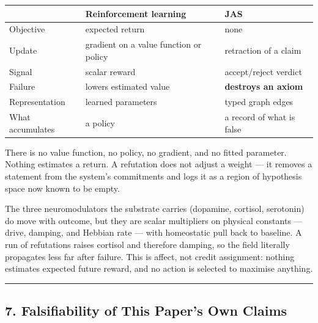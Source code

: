 \documentclass[
  11pt,
  a4paper,
]{article}
\begin{document}
\begin{longtable}[]{@{}
  >{\raggedright\arraybackslash}p{}
  >{\raggedright\arraybackslash}p{}
  >{\raggedright\arraybackslash}p{}@{}}
\toprule\noalign{}
\begin{minipage}[b]{\linewidth}\raggedright
\end{minipage} & \begin{minipage}[b]{\linewidth}\raggedright
Reinforcement learning
\end{minipage} & \begin{minipage}[b]{\linewidth}\raggedright
JAS
\end{minipage} \\
\midrule\noalign{}
\endhead
\bottomrule\noalign{}
\endlastfoot
Objective & expected return & none \\
Update & gradient on a value function or policy & retraction of a
claim \\
Signal & scalar reward & accept/reject verdict \\
Failure & lowers estimated value & \textbf{destroys an axiom} \\
Representation & learned parameters & typed graph edges \\
What accumulates & a policy & a record of what is false \\
\end{longtable}

There is no value function, no policy, no gradient, and no fitted
parameter. Nothing estimates a return. A refutation does not adjust a
weight --- it removes a statement from the system's commitments and logs
it as a region of hypothesis space now known to be empty.

The three neuromodulators the substrate carries (dopamine, cortisol,
serotonin) do move with outcome, but they are scalar multipliers on
physical constants --- drive, damping, and Hebbian rate --- with
homeostatic pull back to baseline. A run of refutations raises cortisol
and therefore damping, so the field literally propagates less far after
failure. This is affect, not credit assignment: nothing estimates
expected future reward, and no action is selected to maximise anything.

\begin{center}\rule{0.5\linewidth}{0.5pt}\end{center}

\subsection{7. Falsifiability of This Paper's Own
Claims}\label{falsifiability-of-this-papers-own-claims}
\end{document}
